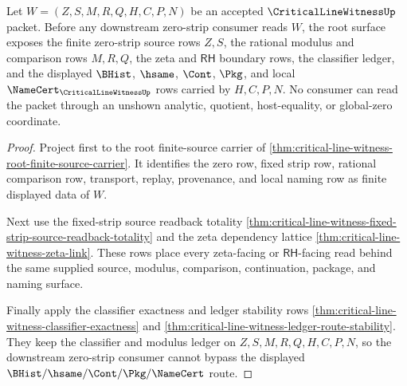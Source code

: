 \begin{theorem}
\label{thm:critical-line-witness-root-finite-source-namecert-obligations}
Let $W=(Z,S,M,R,Q,H,C,P,N)$ be an accepted $\CriticalLineWitnessUp$ packet.
Before any downstream zero-strip consumer reads $W$, the root surface exposes
the finite zero-strip source rows $Z,S$, the rational modulus and comparison
rows $M,R,Q$, the zeta and $\mathsf{RH}$ boundary rows, the classifier
ledger, and the displayed $\BHist$, $\hsame$, $\Cont$, $\Pkg$, and local
$\NameCert_{\CriticalLineWitnessUp}$ rows carried by $H,C,P,N$. No consumer
can read the packet through an unshown analytic, quotient, host-equality, or
global-zero coordinate.
\end{theorem}
\begin{proof}
Project first to the root finite-source carrier of
\autoref{thm:critical-line-witness-root-finite-source-carrier}. It identifies
the zero row, fixed strip row, rational comparison row, transport, replay,
provenance, and local naming row as finite displayed data of $W$.

Next use the fixed-strip source readback totality
\autoref{thm:critical-line-witness-fixed-strip-source-readback-totality} and
the zeta dependency lattice \autoref{thm:critical-line-witness-zeta-link}.
These rows place every zeta-facing or $\mathsf{RH}$-facing read behind the
same supplied source, modulus, comparison, continuation, package, and naming
surface.

Finally apply the classifier exactness and ledger stability rows
\autoref{thm:critical-line-witness-classifier-exactness} and
\autoref{thm:critical-line-witness-ledger-route-stability}. They keep the
classifier and modulus ledger on $Z,S,M,R,Q,H,C,P,N$, so the downstream
zero-strip consumer cannot bypass the displayed $\BHist/\hsame/\Cont/\Pkg/
\NameCert$ route.
\end{proof}

